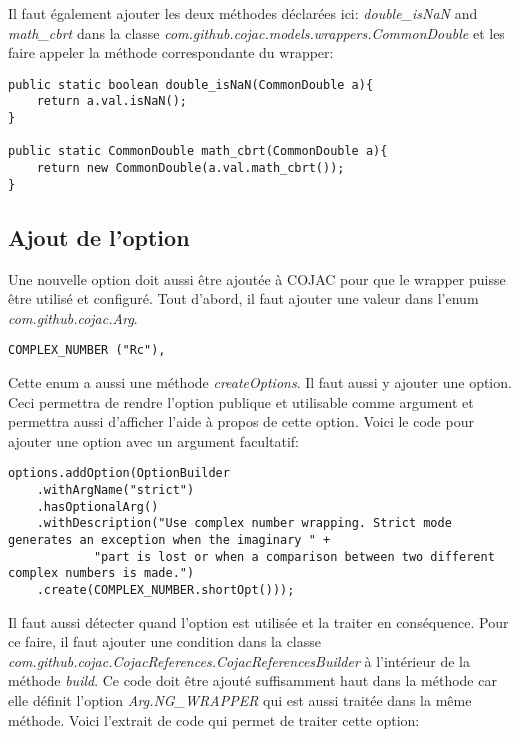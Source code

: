 Il faut également ajouter les deux méthodes déclarées ici: \textit{double\_isNaN} and \textit{math\_cbrt} dans la classe \textit{com.github.cojac.models.wrappers.CommonDouble} et les faire appeler la méthode correspondante du wrapper:

\begin{verbatim}
public static boolean double_isNaN(CommonDouble a){
    return a.val.isNaN();
}

public static CommonDouble math_cbrt(CommonDouble a){
    return new CommonDouble(a.val.math_cbrt());
}
\end{verbatim}

\subsection{Ajout de l'option}

Une nouvelle option doit aussi être ajoutée à COJAC pour que le wrapper puisse être utilisé et configuré. Tout d'abord, il faut ajouter une valeur dans l'enum \textit{com.github.cojac.Arg}.

\begin{verbatim}
COMPLEX_NUMBER ("Rc"),
\end{verbatim}

Cette enum a aussi une méthode \textit{createOptions}. Il faut aussi y ajouter une option. Ceci permettra de rendre l'option publique et utilisable comme argument et permettra aussi d'afficher l'aide à propos de cette option. Voici le code pour ajouter une option avec un argument facultatif:

\begin{verbatim}
options.addOption(OptionBuilder
    .withArgName("strict")
    .hasOptionalArg()
    .withDescription("Use complex number wrapping. Strict mode generates an exception when the imaginary " +
            "part is lost or when a comparison between two different complex numbers is made.")
    .create(COMPLEX_NUMBER.shortOpt()));
\end{verbatim}

Il faut aussi détecter quand l'option est utilisée et la traiter en conséquence. Pour ce faire, il faut ajouter une condition dans la classe \textit{com.github.cojac.CojacReferences.CojacReferencesBuilder} à l'intérieur de la méthode \textit{build}. Ce code doit être ajouté suffisamment haut dans la méthode car elle définit l'option \textit{Arg.NG\_WRAPPER} qui est aussi traitée dans la même méthode. Voici l'extrait de code qui permet de traiter cette option:

